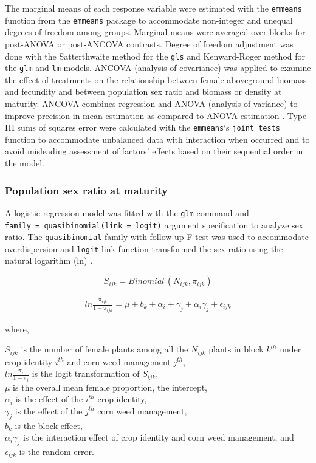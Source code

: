 \documentclass[
]{article}
\begin{document}
The marginal means of each response variable were estimated with the \texttt{emmeans} function from the \texttt{emmeans} package \citep[version 1.7.1-1,][]{lenthEmmeansEstimatedMarginal2021} to accommodate non-integer and unequal degrees of freedom among groups. Marginal means were averaged over blocks for post-ANOVA or post-ANCOVA contrasts. Degree of freedom adjustment was done with the Satterthwaite method for the \texttt{gls} and Kenward-Roger method for the \texttt{glm} and \texttt{lm} models. ANCOVA (analysis of covariance) was applied to examine the effect of treatments on the relationship between female aboveground biomass and fecundity and between population sex ratio and biomass or density at maturity.
ANCOVA combines regression and ANOVA (analysis of variance) to improve precision in mean estimation as compared to ANOVA estimation \citep{yangAnalysisCovarianceAgronomy2011}. Type III sums of squares error were calculated with the \texttt{emmeans}`s \texttt{joint\_tests} function to accommodate unbalanced data with interaction when occurred and to avoid misleading assessment of factors' effects based on their sequential order in the model.

\hypertarget{population-sex-ratio-at-maturity}{%
\subsubsection*{Population sex ratio at maturity}\label{population-sex-ratio-at-maturity}}

A logistic regression model was fitted with the \texttt{glm} command and \texttt{family\ =\ quasibinomial(link\ =\ logit)} argument specification to analyze sex ratio. The \texttt{quasibinomial} family with follow-up F-test was used to accommodate overdispersion and \texttt{logit} link function transformed the sex ratio using the natural logarithm (ln) \citep{crawleyProportionData2013}.

\[ S_{ijk} = Binomial\,(N_{ijk},\pi_{ijk}) \]

\begin{align}
ln \frac{\pi_{ijk}}{1-\pi_{ijk}} = \mu + b_k + \alpha_i + \gamma_j +\alpha_i \gamma_j + \epsilon_{ijk} \label{eq:sex-mature}
\end{align}

where,

\(S_{ijk}\) is the number of female plants among all the \(N_{ijk}\) plants in block \(k^{th}\) under crop identity \(i^{th}\) and corn weed management \(j^{th}\),\\
\(ln \frac{\pi_i}{1-\pi_i}\) is the logit transformation of \(S_{ijk}\),\\
\(\mu\) is the overall mean female proportion, the intercept,\\
\(\alpha_i\) is the effect of the \(i^{th}\) crop identity,\\
\(\gamma_j\) is the effect of the \(j^{th}\) corn weed management,\\
\(b_k\) is the block effect,\\
\(\alpha_i \gamma_j\) is the interaction effect of crop identity and corn weed management, and\\
\(\epsilon_{ijk}\) is the random error.
\end{document}
